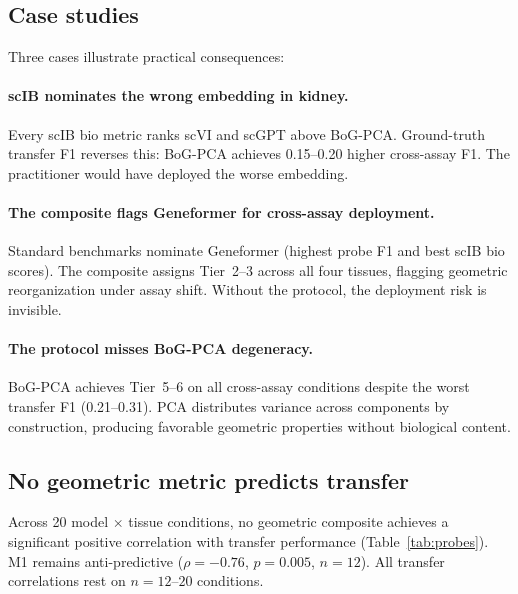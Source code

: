 \documentclass[11pt]{article}
\begin{document}
\subsection{Case studies}

Three cases illustrate practical consequences:

\paragraph{scIB nominates the wrong embedding in kidney.} Every scIB bio metric ranks scVI and scGPT above BoG-PCA. Ground-truth transfer F1 reverses this: BoG-PCA achieves 0.15--0.20 higher cross-assay F1. The practitioner would have deployed the worse embedding.

\paragraph{The composite flags Geneformer for cross-assay deployment.} Standard benchmarks nominate Geneformer (highest probe F1 and best scIB bio scores). The composite assigns Tier~2--3 across all four tissues, flagging geometric reorganization under assay shift. Without the protocol, the deployment risk is invisible.

\paragraph{The protocol misses BoG-PCA degeneracy.} BoG-PCA achieves Tier~5--6 on all cross-assay conditions despite the worst transfer F1 (0.21--0.31). PCA distributes variance across components by construction, producing favorable geometric properties without biological content.

\subsection{No geometric metric predicts transfer}

Across 20 model $\times$ tissue conditions, no geometric composite achieves a significant positive correlation with transfer performance (Table~\ref{tab:probes}). M1 remains anti-predictive ($\rho = -0.76$, $p = 0.005$, $n = 12$). All transfer correlations rest on $n = 12$--$20$ conditions.
\end{document}
